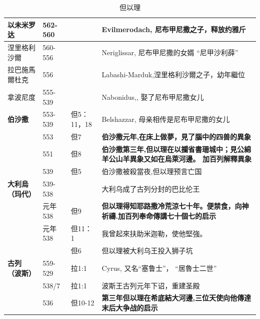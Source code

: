 \begin{table}[!hbp]
\begin{tabular}{|p{2.8cm}|p{1.5cm}|p{2.5cm}|p{8.5cm}| }
\textbf{以未米罗达 }& 562-560 &  &Evilmerodach, 尼布甲尼撒之子，释放约雅斤\\\hline
涅里格利沙爾  & 560-556 & &Neriglissar, 尼布甲尼撒的女婿\cite{Neriglissar} “尼甲沙利薛”\cite{尼甲沙利薛}\\\hline
拉巴施馬爾杜克 &  556&  &Labashi-Marduk,涅里格利沙爾之子，幼年繼位\cite{Labashi-Marduk} \\\hline
拿波尼度 &	555-539&	&Nabonidus,\cite{Nabonidus}, 娶了尼布甲尼撒女儿\cite{尼甲沙利薛}\\\hline
\textbf{伯沙撒	}&553-539&	但5：11，18&Belshazzar,  母亲相传是尼布甲尼撒的女儿\cite{尼甲沙利薛}\\\hline	
&553&但7& \textcolor[rgb]{0,.1,1}{\textbf{伯沙撒元年,在床上做夢，見了腦中的四兽的異象}}  \\\hline	
	&551\cite{伯沙撒}&但8&\textcolor[rgb]{0,.1,1}{\textbf{伯沙撒第三年,但以理在以攔省書珊城中；見公綿羊公山羊異象又如在烏萊河邊。 加百列解釋異象}}  \\\hline
		&539  &	 	 但5& 伯沙撒被殺當夜,但以理预言亡国  \\\hline			
\textbf{大利烏（玛代）}&	539-538	&	 	 &大利乌成了古列分封的巴比伦王\cite{伯沙撒}	    \\\hline
&	元年538	&	但9	 &   \textcolor[rgb]{0,.1,1}{\textbf{但以理得知耶路撒冷荒涼七十年。便禁食，向神祈禱.加百列奉命傳講七十個七的启示 }}   \\\hline
&	元年538	&	但11：1	 &   我曾起來扶助米迦勒，使他堅強。   \\\hline
&	 	&	但6	 &   但以理被大利乌王投入狮子坑	    \\\hline
\textbf{古列     （波斯）}&	559-529	& 拉1:1 &Cyrus, 又名“塞鲁士”， “居魯士二世” \\\hline	
&538/7 \cite{居鲁士}&拉1:1 & 波斯王古列元年下诏，重建圣殿    \\\hline	
&536&但10-12 & \textcolor[rgb]{0.0,.1,1}{\textbf{第三年但以理在希底結大河邊,三位天使向他傳達末后大争战的启示} }   \\\hline			
\end{tabular}
\caption{但以理}
\end{table}

